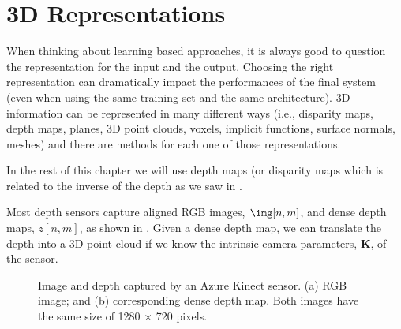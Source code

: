\section{3D Representations}

When thinking about learning based approaches, it is always good to question the representation for the input and the output. Choosing the right representation can dramatically impact the performances of the final system (even when using the same training set and the same architecture). 3D information can be represented in many different ways (i.e., disparity maps, depth maps, planes, 3D point clouds, voxels, implicit functions, surface normals, meshes) and there are methods for each one of those representations.



In the rest of this chapter we will use depth maps (or disparity maps which is related to the inverse of the depth as we saw in \chap{\ref{chap:stereo_vision}}.

Most depth sensors capture aligned RGB images, $\img [n,m]$, and dense depth maps, $z [n,m]$, as shown in \fig{\ref{fig:kinect}}. Given a dense depth map, we can translate the depth into a 3D point cloud if we know the intrinsic camera parameters, $\mathbf{K}$, of the sensor.



\begin{figure}[t]
    \centerline{
    }
    \caption{Image and depth captured by an Azure Kinect sensor. (a) RGB image; and (b) corresponding dense depth map. Both images have the same size of 1280 $\times$ 720 pixels.}
    \label{fig:kinect}
\end{figure}



